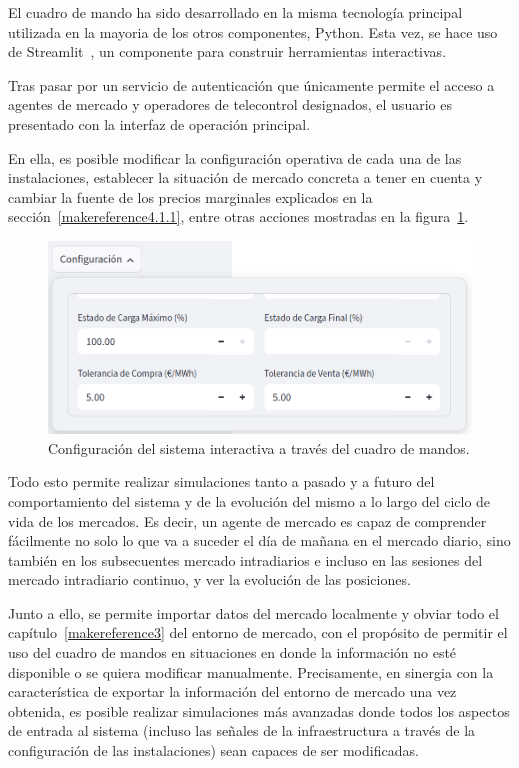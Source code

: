 El cuadro de mando ha sido desarrollado en la misma tecnología principal utilizada en la mayoria de los otros componentes, Python. Esta vez, se hace uso de Streamlit~\cite{streamlit2025faster}, un componente para construir herramientas interactivas.

Tras pasar por un servicio de autenticación que únicamente permite el acceso a agentes de mercado y operadores de telecontrol designados, el usuario es presentado con la interfaz de operación principal.

En ella, es posible modificar la configuración operativa de cada una de las instalaciones, establecer la situación de mercado concreta a tener en cuenta y cambiar la fuente de los precios marginales explicados en la sección~\ref{makereference4.1.1}, entre otras acciones mostradas en la figura~\ref{fig:configuracion-sistema}.

\begin{figure}
  \centering
  \includegraphics[width=0.5\linewidth]{figures/configuracion-sistema.png}
  \caption[Configuración del sistema.]{Configuración del sistema interactiva a través del cuadro de mandos.}
  \label{fig:configuracion-sistema}
\end{figure}

Todo esto permite realizar simulaciones tanto a pasado y a futuro del comportamiento del sistema y de la evolución del mismo a lo largo del ciclo de vida de los mercados. Es decir, un agente de mercado es capaz de comprender fácilmente no solo lo que va a suceder el día de mañana en el mercado diario, sino también en los subsecuentes mercado intradiarios e incluso en las sesiones del mercado intradiario continuo, y ver la evolución de las posiciones.

Junto a ello, se permite importar datos del mercado localmente y obviar todo el capítulo~\ref{makereference3} del entorno de mercado, con el propósito de permitir el uso del cuadro de mandos en situaciones en donde la información no esté disponible o se quiera modificar manualmente. Precisamente, en sinergia con la característica de exportar la información del entorno de mercado una vez obtenida, es posible realizar simulaciones más avanzadas donde todos los aspectos de entrada al sistema (incluso las señales de la infraestructura a través de la configuración de las instalaciones) sean capaces de ser modificadas.

